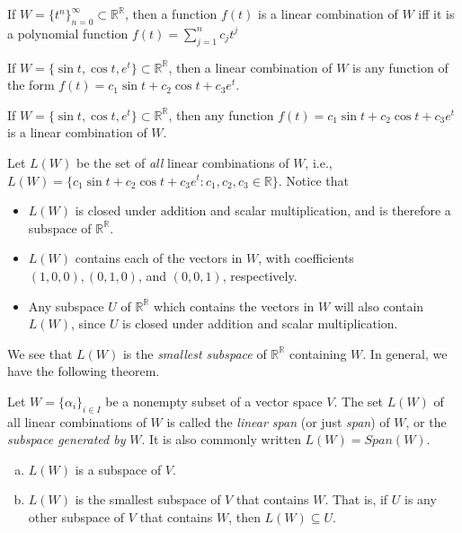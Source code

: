 \documentclass[12pt,letterpaper,reqno]{article}
\numberwithin{equation}{section}
\newcommand{\ti}[1]{\textit{#1}}
\begin{document}
\begin{example}
If $W=\{t^n\}_{n=0}^\infty \subset \mathbb{R}^\mathbb{R}$, then a function $f(t)$ is a linear combination of $W$ iff it is a polynomial function $f(t)=\sum_{j=1}^nc_jt^j$	
\end{example}

\begin{example}
If $W=\{\sin t, \cos t, e^t\} \subset \mathbb{R}^\mathbb{R}$, then a linear combination of $W$ is any function of the form $f(t)=c_1 \sin t+c_2 \cos t+c_3 e^t$.	
\end{example}

\begin{example}
If $W=\{\sin t, \cos t, e^t\} \subset \mathbb{R}^\mathbb{R}$, then any function $f(t)=c_1 \sin t+c_2 \cos t+c_3 e^t$ is a linear combination of $W$.

Let $L(W)$ be the set of \emph{all} linear combinations of $W$, i.e., $L(W)=\{c_1 \sin t+c_2 \cos t+c_3 e^t: c_1,c_2,c_3 \in \mathbb{R}\}$. Notice that 
\begin{itemize}
	\item $L(W)$ is closed under addition and scalar multiplication, and is therefore a subspace of $\mathbb{R}^\mathbb{R}$. 
	\item $L(W)$ contains each of the vectors in $W$, with coefficients $(1,0,0), (0,1,0)$, and $(0,0,1)$, respectively.
	\item Any subspace $U$ of $\mathbb{R}^\mathbb{R}$ which contains the vectors in $W$ will also contain $L(W)$, since $U$ is closed under addition and scalar multiplication.
\end{itemize} 
\end{example}
We see that $L(W)$ is the \emph{smallest subspace} of $\mathbb{R}^\mathbb{R}$ containing $W$. In general, we have the following theorem.

\begin{defn}
Let $W=\{\alpha_i\}_{i\in I}$ be a nonempty subset of a vector space $V$. The set $L(W)$ of all linear combinations of $W$ is called the \ti{linear span} (or just \ti{span}) of $W$, or the \ti{subspace generated by} $W$. It is also commonly written $L(W)=Span(W)$.	
\end{defn}

\begin{thm}
\begin{enumerate}[(a)]
	\item $L(W)$ is a subspace of $V$.
	\item $L(W)$ is the smallest subspace of $V$ that contains $W$. That is, if $U$ is any other subspace of $V$ that contains $W$, then $L(W) \subseteq U$.
\end{enumerate}	
\end{thm}
\end{document}
